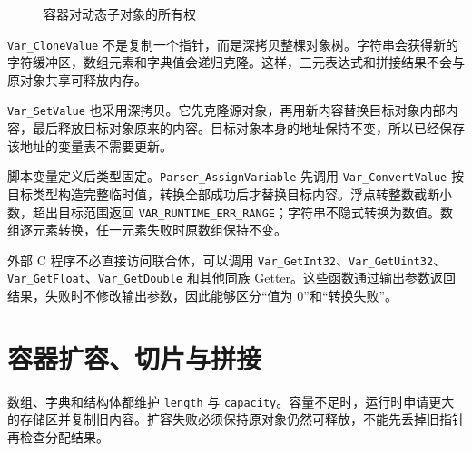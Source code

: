 \begin{figure}[htbp]
\centering
{}
\caption{容器对动态子对象的所有权} \label{fig:app-var-ownership}
\end{figure}

\texttt{Var\_CloneValue} 不是复制一个指针，而是深拷贝整棵对象树。字符串会获得新的字符缓冲区，数组元素和字典值会递归克隆。这样，三元表达式和拼接结果不会与原对象共享可释放内存。

\texttt{Var\_SetValue} 也采用深拷贝。它先克隆源对象，再用新内容替换目标对象内部内容，最后释放目标对象原来的内容。目标对象本身的地址保持不变，所以已经保存该地址的变量表不需要更新。

脚本变量定义后类型固定。\texttt{Parser\_AssignVariable} 先调用 \texttt{Var\_ConvertValue} 按目标类型构造完整临时值，转换全部成功后才替换目标内容。浮点转整数截断小数，超出目标范围返回 \texttt{VAR\_RUNTIME\_ERR\_RANGE}；字符串不隐式转换为数值。数组逐元素转换，任一元素失败时原数组保持不变。

外部 C 程序不必直接访问联合体，可以调用 \texttt{Var\_GetInt32}、\texttt{Var\_GetUint32}、\texttt{Var\_GetFloat}、\texttt{Var\_GetDouble} 和其他同族 Getter。这些函数通过输出参数返回结果，失败时不修改输出参数，因此能够区分“值为 0”和“转换失败”。

\section{容器扩容、切片与拼接}

数组、字典和结构体都维护 \texttt{length} 与 \texttt{capacity}。容量不足时，运行时申请更大的存储区并复制旧内容。扩容失败必须保持原对象仍然可释放，不能先丢掉旧指针再检查分配结果。

